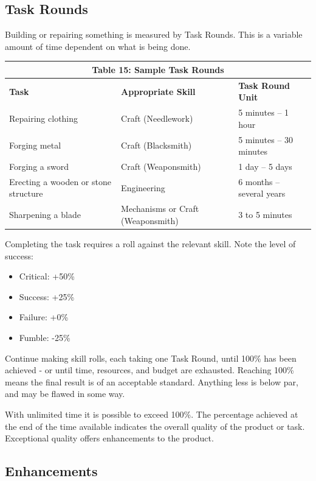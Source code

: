\documentclass[10pt]{article}
\begin{document}
\subsection{Task Rounds}
\label{sec:task-rounds}

Building or repairing something is measured by Task Rounds. This is a variable amount of time dependent on what is being done.

\begin{longtable}[c]{|l|l|l|}
\hline
\multicolumn{3}{|c|}{\textbf{Table 15: Sample Task Rounds}} \\
\hline
\textbf{Task} & \textbf{Appropriate Skill} & \textbf{Task Round Unit} \\
\hline
Repairing clothing & Craft (Needlework) & 5 minutes – 1 hour \\
\hline
Forging metal & Craft (Blacksmith) & 5 minutes – 30 minutes \\
\hline
Forging a sword & Craft (Weaponsmith) & 1 day – 5 days \\
\hline
Erecting a wooden or stone structure & Engineering & 6 months – several years \\
\hline
Sharpening a blade & Mechanisms or Craft (Weaponsmith) & 3 to 5 minutes \\
\hline
\end{longtable}

Completing the task requires a roll against the relevant skill. Note the level of success:

\begin{itemize}
    \item Critical: +50\%
    \item Success: +25\%
    \item Failure: +0\%
    \item Fumble: -25\%
\end{itemize}

Continue making skill rolls, each taking one Task Round, until 100\% has been achieved - or until time, resources, and budget are exhausted. Reaching 100\% means the final result is of an acceptable standard. Anything less is below par, and may be flawed in some way.

With unlimited time it is possible to exceed 100\%. The percentage achieved at the end of the time available indicates the overall quality of the product or task. Exceptional quality offers enhancements to the product.

\subsection{Enhancements}
\label{sec:enhancements}
\end{document}
